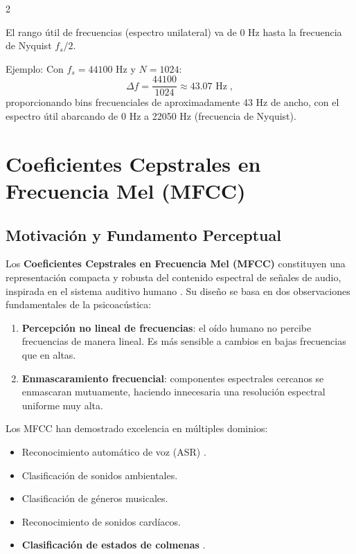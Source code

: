 \documentclass[12pt]{report}
\newenvironment{tightmulticols}{%
  \begin{multicols}{2}
  \setlength{\parskip}{1.2pt}
  \linespread{1}\selectfont
}{%
  \end{multicols}
}
\begin{document}
\begin{tightmulticols}
\noindent El rango útil de frecuencias (espectro unilateral) va de $0$ Hz hasta la frecuencia de Nyquist $f_s/2$.

\par Ejemplo: Con $f_s = 44100$ Hz y $N = 1024$:
\begin{equation*}
    \Delta f = \frac{44100}{1024} \approx 43.07 \text{ Hz} \; ,
\end{equation*}
proporcionando bins frecuenciales de aproximadamente 43 Hz de ancho, con el espectro útil abarcando de 0 Hz a 22050 Hz (frecuencia de Nyquist).


\section{Coeficientes Cepstrales en Frecuencia Mel (MFCC)}

\subsection{Motivación y Fundamento Perceptual}

\noindent Los \textbf{Coeficientes Cepstrales en Frecuencia Mel (MFCC)} constituyen una representación compacta y robusta del contenido espectral de señales de audio, inspirada en el sistema auditivo humano \cite{ruvinga2023}. Su diseño se basa en dos observaciones fundamentales de la psicoacústica:

\begin{enumerate}
    \item \textbf{Percepción no lineal de frecuencias}: el oído humano no percibe frecuencias de manera lineal. Es más sensible a cambios en bajas frecuencias que en altas.
    \item \textbf{Enmascaramiento frecuencial}: componentes espectrales cercanos se enmascaran mutuamente, haciendo innecesaria una resolución espectral uniforme muy alta.
\end{enumerate}

\noindent Los MFCC han demostrado excelencia en múltiples dominios:
\begin{itemize}
    \item Reconocimiento automático de voz (ASR) \cite{ruvinga2023}.
    \item Clasificación de sonidos ambientales.
    \item Clasificación de géneros musicales.
    \item Reconocimiento de sonidos cardíacos.
    \item \textbf{Clasificación de estados de colmenas} \cite{ruvinga2021, ruvinga2023}.
\end{itemize}


\end{tightmulticols}
\end{document}

